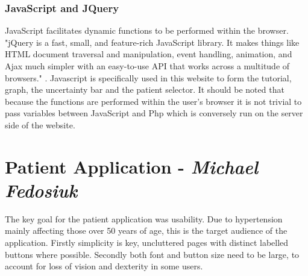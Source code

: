 \documentclass[11pt]{article}
\begin{document}
\subsubsection{JavaScript and JQuery}
JavaScript facilitates dynamic functions to be performed within the browser. "jQuery is a fast, small, and feature-rich JavaScript library. It makes things like HTML document traversal and manipulation, event handling, animation, and Ajax much simpler with an easy-to-use API that works across a multitude of browsers." \cite{Jquery}. Javascript is specifically used in this website to form the tutorial, graph, the uncertainty bar and the patient selector. It should be noted that because the functions are performed within the user's browser it is not trivial to pass variables between JavaScript and Php which is conversely run on the server side of the website. 


\section{Patient Application - \textit{Michael Fedosiuk}}

The key goal for the patient application was usability. Due to hypertension mainly affecting those over 50 years of age, this is the target audience of the application. Firstly simplicity is key, uncluttered pages with distinct labelled buttons where possible. Secondly both font and button size need to be large, to account for loss of vision and dexterity in some users. 
\end{document}
